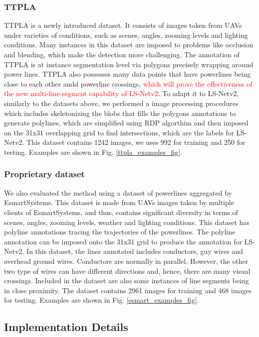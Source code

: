 \documentclass[journal]{IEEEtran}
\begin{document}
\subsubsection{TTPLA}

TTPLA \cite{TTPLA} is a newly introduced dataset. It consists of images taken from UAVs under varieties of conditions, such as scenes, angles, zooming levels and lighting conditions. Many instances in this dataset are imposed to problems like occlusion and blending, which make the detection more challenging. The annotation of TTPLA is at instance segmentation level via polygons precisely wrapping around power lines. TTPLA also possesses many data points that have powerlines being close to each other andd powerline crossings, \textcolor{red}{which will prove the effectiveness of the new multi-line-segment capability of LS-Netv2}. To adapt it to LS-Netv2, similarly to the datasets above, we performed a image processing procedures which includes skeletonizing the blobs that fills the polygons annotations to generate polylines, which are simplified using RDP algorthim and then imposed on the 31x31 overlapping grid to find intersections, which are the labels for LS-Netv2. This dataset contains 1242 images, we uses 992 for training and 250 for testing. Examples are shown in Fig. \ref{ttpla_examples_fig}.
\subsubsection{Proprietary dataset}

We also evaluated the method using a dataset of powerlines aggregated by EsmartSystems. This dataset is made from UAVs images taken by multiple clients of EsmartSystems, and thus, contains significant diversity in terms of scenes, angles, zooming levels, weather and lighting conditions. This dataset has polyline annotations tracing the trajectories of the powerlines. The polyline annotation can be imposed onto the 31x31 grid to produce the annotation for LS-Netv2.
In this dataset, the lines annotated includes conductors, guy wires and overhead ground wires. Conductors are normally in parallel. However, the other two type of wires can have different directions and, hence, there are many visual crossings. Included in the dataset are also some instances of line segments being in close proximity. The dataset contains 2961 images for training and 468 images for testing. Examples are shown in Fig. \ref{esmart_examples_fig}.

\subsection{Implementation Details}
\end{document}
